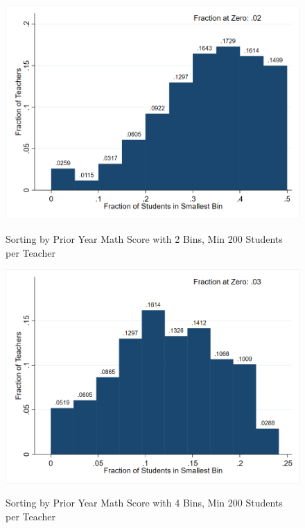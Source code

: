 \documentclass[letterpaper,12pt]{article}
\begin{document}
\begin{figure}[ht]
    \centering
    \caption{Sorting by Prior Year Math Score with 2 Bins, Min 200 Students per Teacher}
    \includegraphics[width=\textwidth]{figures/ELA_Sorting_2_200.png}
    \label{fig: Math sort 2 200}
\end{figure}

\begin{figure}[ht]
    \centering
    \caption{Sorting by Prior Year Math Score with 4 Bins, Min 200 Students per Teacher}
    \includegraphics[width=\textwidth]{figures/ELA_Sorting_4_200.png}
    \label{fig: Math sort 4 200}
\end{figure}
\end{document}
